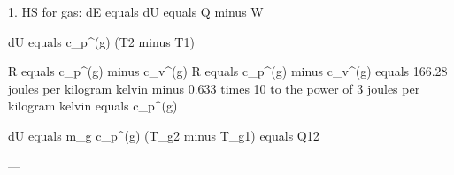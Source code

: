 1. HS for gas:  
dE equals dU equals Q minus W  

dU equals c_p^(g) (T2 minus T1)  

R equals c_p^(g) minus c_v^(g)  
R equals c_p^(g) minus c_v^(g) equals 166.28 joules per kilogram kelvin minus 0.633 times 10 to the power of 3 joules per kilogram kelvin equals c_p^(g)  

dU equals m_g c_p^(g) (T_g2 minus T_g1) equals Q12  

---